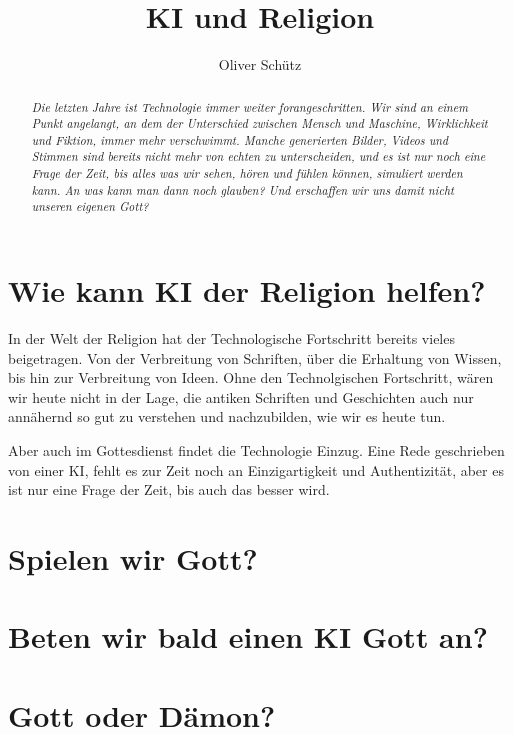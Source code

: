 \documentclass[10pt]{article}
\title{KI und Religion}
\author{Oliver Schütz}
\begin{document}
\maketitle


\begin{abstract}
  \textit
  {Die letzten Jahre ist Technologie immer weiter forangeschritten.
  Wir sind an einem Punkt angelangt, an dem der Unterschied zwischen Mensch und Maschine,
  Wirklichkeit und Fiktion, immer mehr verschwimmt.
  Manche generierten Bilder, Videos und Stimmen sind bereits nicht mehr von echten zu unterscheiden,
  und es ist nur noch eine Frage der Zeit, bis alles was wir sehen, hören und fühlen können, simuliert werden kann.
  An was kann man dann noch glauben? Und erschaffen wir uns damit nicht unseren eigenen Gott?
  }
\end{abstract}
\section{Wie kann KI der Religion helfen?}
In der Welt der Religion hat der Technologische Fortschritt bereits vieles beigetragen.
Von der Verbreitung von Schriften, über die Erhaltung von Wissen, bis hin zur Verbreitung von Ideen.
Ohne den Technolgischen Fortschritt, wären wir heute nicht in der Lage, die antiken Schriften und Geschichten auch nur annähernd so gut zu verstehen und nachzubilden, wie wir es heute tun.

Aber auch im Gottesdienst findet die Technologie Einzug.
Eine Rede geschrieben von einer KI, fehlt es zur Zeit noch an Einzigartigkeit und Authentizität, aber es ist nur eine Frage der Zeit, bis auch das besser wird.
\cite{BR}



\cite{Kurzweil}
\section{Spielen wir Gott?}
\section{Beten wir bald einen KI Gott an?}
\section{Gott oder Dämon?}





\end{document}
